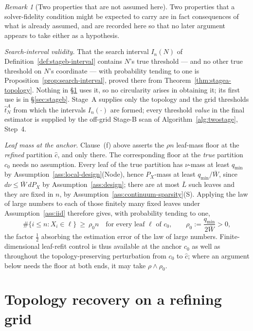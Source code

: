 \documentclass[11pt]{article}
\theoremstyle{plain}
\theoremstyle{definition}
\theoremstyle{remark}
\newtheorem{remark}[theorem]{Remark}
\begin{document}
\begin{remark}[Two properties that are not assumed here]\label{rem:not-assumed}
Two properties that a solver-fidelity condition might be expected to carry are
in fact consequences of what is already assumed, and are recorded here so that
no later argument appears to take either as a hypothesis.

\emph{Search-interval validity.} That the search interval $I_n(N)$ of
Definition~\ref{def:stageb-interval} contains $N$'s true threshold --- and no
other true threshold on $N$'s coordinate --- with probability tending to one
is Proposition~\ref{prop:search-interval}, proved there from
Theorem~\ref{thm:stagea-topology}. Nothing in \S\ref{sec:topology} uses
it, so no circularity arises in obtaining it; its first use is in
\S\ref{sec:stageb}. Stage~A supplies only the topology and the grid
thresholds $\hat t^A_N$ from which the intervals $I_n(\cdot)$ are formed;
every threshold \emph{value} in the final estimator is
supplied by the off-grid Stage-B scan of Algorithm~\ref{alg:twostage}, Step~4.

\emph{Leaf mass at the anchor.} Clause~(f) above asserts the $\rho n$
leaf-mass floor at the \emph{refined} partition $\hat c$, and only there. The
corresponding floor at the \emph{true} partition $c_0$ needs no assumption.
Every leaf of the true partition has $\nu$-mass at least $q_{\min}$ by
Assumption~\ref{ass:local-design}(Node), hence $P_X$-mass at least
$q_{\min}/\bar W$, since $d\nu\le\bar W\,dP_X$ by
Assumption~\ref{ass:design}; there are at most $\bar L$ such leaves and they
are fixed in $n$, by Assumption~\ref{ass:continuum-sparsity}(S). Applying the
law of large numbers to each of those finitely many fixed leaves under
Assumption~\ref{ass:iid} therefore gives, with probability tending to one,
\[
  \#\{i\le n:X_i\in\ell\}\ \ge\ \rho_0n
  \quad\text{for every leaf }\ell\text{ of }c_0,
  \qquad
  \rho_0:=\frac{q_{\min}}{2\bar W}>0 ,
\]
the factor $\tfrac12$ absorbing the estimation error of the law of large
numbers. Finite-dimensional leaf-refit control is thus available at the anchor
$c_0$ as well as throughout the topology-preserving perturbation from $c_0$ to
$\hat c$; where an argument below needs the floor at both ends, it may take
$\rho\wedge\rho_0$.
\end{remark}


\section{Topology recovery on a refining grid}\label{sec:topology}
\end{document}
